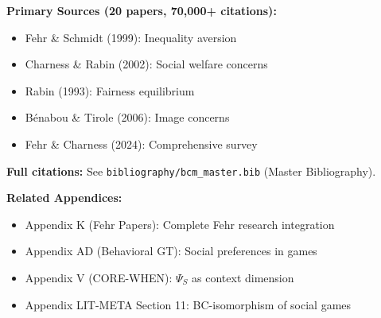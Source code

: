 \textbf{Primary Sources (20 papers, 70,000+ citations):}
\begin{itemize}[nosep]
    \item Fehr \& Schmidt (1999): Inequality aversion
    \item Charness \& Rabin (2002): Social welfare concerns
    \item Rabin (1993): Fairness equilibrium
    \item Bénabou \& Tirole (2006): Image concerns
    \item Fehr \& Charness (2024): Comprehensive survey
\end{itemize}

\textbf{Full citations:} See \texttt{bibliography/bcm\_master.bib} (Master Bibliography).

\textbf{Related Appendices:}
\begin{itemize}[nosep]
    \item Appendix K (Fehr Papers): Complete Fehr research integration
    \item Appendix AD (Behavioral GT): Social preferences in games
    \item Appendix V (CORE-WHEN): $\Psi_S$ as context dimension
    \item Appendix LIT-META Section 11: BC-isomorphism of social games
\end{itemize}

